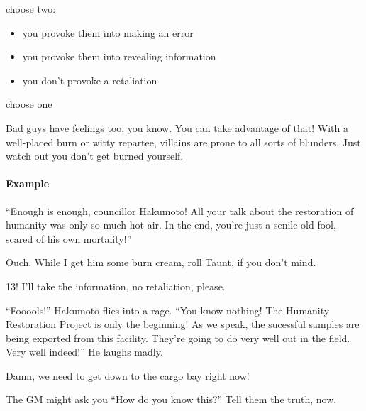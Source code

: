 {choose two:
\begin{itemize}
\item you provoke them into making an error
\item you provoke them into revealing information
\item you don't provoke a retaliation
\end{itemize}}
{choose one}

Bad guys have feelings too, you know. You can take advantage of that!
With a well-placed burn or witty repartee, villains are prone to all
sorts of blunders. Just watch out you don't get burned yourself.

\paragraph{Example}
\begin{dialogue}
   ``Enough is enough, councillor Hakumoto! All your
  talk about the restoration of humanity was only so much hot air. In
  the end, you're just a senile old fool, scared of his own
  mortality!''

   Ouch. While I get him some burn cream, roll Taunt, if you
  don't mind.

   13! I'll take the information, no retaliation,
  please.

   ``Fooools!'' Hakumoto flies into a rage. ``You know
  nothing! The Humanity Restoration Project is only the beginning! As
  we speak, the sucessful samples are being exported from this
  facility. They're going to do very well out in the field. Very well
  indeed!'' He laughs madly.

   Damn, we need to get down to the cargo bay right now!
\end{dialogue}



The GM might ask you ``How do you know this?'' Tell them the truth, now.


